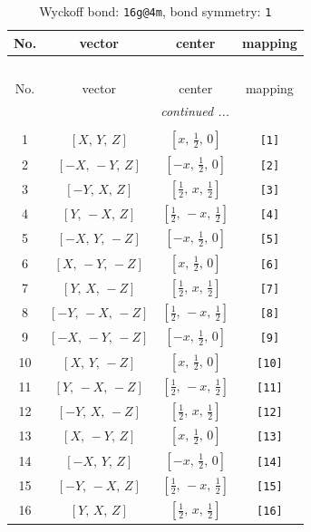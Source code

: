 \documentclass[fleqn,8pt]{jsarticle}
\begin{document}
\begin{longtable}{cccc}
\caption{Wyckoff bond: {\tt 16g@4m}, bond symmetry: {\tt 1}}
 \\
 \hline \hline
No. & vector & center & mapping \\ \hline \endfirsthead

\multicolumn{3}{l}{\tablename\ \thetable{}} \\
 \hline \hline
No. & vector & center & mapping \\ \hline \endhead

 \hline \hline
\multicolumn{3}{r}{\footnotesize\it continued ...} \\ \endfoot

 \hline \hline
\multicolumn{3}{r}{} \\ \endlastfoot

1 & $\left[ X,\, Y,\, Z \right]$ & $\left[ x,\, \frac{1}{2},\, 0 \right]$ & {\tt [1]} \\ \hline
2 & $\left[ - X,\, - Y,\, Z \right]$ & $\left[ - x,\, \frac{1}{2},\, 0 \right]$ & {\tt [2]} \\ \hline
3 & $\left[ - Y,\, X,\, Z \right]$ & $\left[ \frac{1}{2},\, x,\, \frac{1}{2} \right]$ & {\tt [3]} \\ \hline
4 & $\left[ Y,\, - X,\, Z \right]$ & $\left[ \frac{1}{2},\, - x,\, \frac{1}{2} \right]$ & {\tt [4]} \\ \hline
5 & $\left[ - X,\, Y,\, - Z \right]$ & $\left[ - x,\, \frac{1}{2},\, 0 \right]$ & {\tt [5]} \\ \hline
6 & $\left[ X,\, - Y,\, - Z \right]$ & $\left[ x,\, \frac{1}{2},\, 0 \right]$ & {\tt [6]} \\ \hline
7 & $\left[ Y,\, X,\, - Z \right]$ & $\left[ \frac{1}{2},\, x,\, \frac{1}{2} \right]$ & {\tt [7]} \\ \hline
8 & $\left[ - Y,\, - X,\, - Z \right]$ & $\left[ \frac{1}{2},\, - x,\, \frac{1}{2} \right]$ & {\tt [8]} \\ \hline
9 & $\left[ - X,\, - Y,\, - Z \right]$ & $\left[ - x,\, \frac{1}{2},\, 0 \right]$ & {\tt [9]} \\ \hline
10 & $\left[ X,\, Y,\, - Z \right]$ & $\left[ x,\, \frac{1}{2},\, 0 \right]$ & {\tt [10]} \\ \hline
11 & $\left[ Y,\, - X,\, - Z \right]$ & $\left[ \frac{1}{2},\, - x,\, \frac{1}{2} \right]$ & {\tt [11]} \\ \hline
12 & $\left[ - Y,\, X,\, - Z \right]$ & $\left[ \frac{1}{2},\, x,\, \frac{1}{2} \right]$ & {\tt [12]} \\ \hline
13 & $\left[ X,\, - Y,\, Z \right]$ & $\left[ x,\, \frac{1}{2},\, 0 \right]$ & {\tt [13]} \\ \hline
14 & $\left[ - X,\, Y,\, Z \right]$ & $\left[ - x,\, \frac{1}{2},\, 0 \right]$ & {\tt [14]} \\ \hline
15 & $\left[ - Y,\, - X,\, Z \right]$ & $\left[ \frac{1}{2},\, - x,\, \frac{1}{2} \right]$ & {\tt [15]} \\ \hline
16 & $\left[ Y,\, X,\, Z \right]$ & $\left[ \frac{1}{2},\, x,\, \frac{1}{2} \right]$ & {\tt [16]} \\
\end{longtable}
\end{document}
